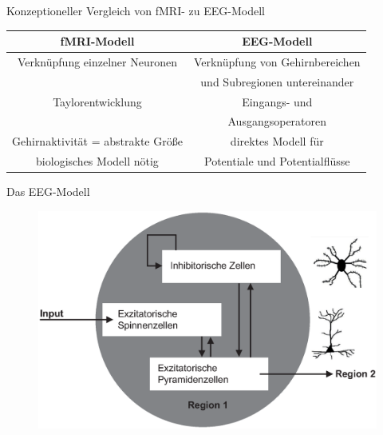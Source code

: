\documentclass{beamer}
\begin{document}
\begin{frame}{Konzeptioneller Vergleich von fMRI- zu EEG-Modell}
\begin{tabular}{| c | c |}
\hline
\textbf{fMRI-Modell} & \textbf{EEG-Modell} \\
\hline
Verknüpfung einzelner Neuronen & Verknüpfung von Gehirnbereichen \\
&  und Subregionen untereinander \\
\hline
Taylorentwicklung & Eingangs- und \\
&  Ausgangsoperatoren \\
\hline
Gehirnaktivität = abstrakte Größe & direktes Modell für \\
biologisches Modell nötig & Potentiale und Potentialflüsse\\
\hline
\end{tabular}
\end{frame}

\begin{frame}{Das EEG-Modell}
\begin{figure}
\centering
\includegraphics[scale=0.4]{res/160711EEGModell1.eps}
\end{figure}
\end{frame}
\end{document}
